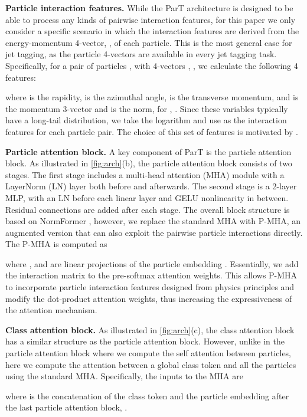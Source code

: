 \documentclass[nohyperref]{article}
\theoremstyle{plain}
\theoremstyle{definition}
\theoremstyle{remark}
\begin{document}
\textbf{Particle interaction features.} While the ParT architecture is designed to be able to process any kinds of pairwise interaction features, for this paper we only consider a specific scenario in which the interaction features are derived from the energy-momentum 4-vector, , of each particle. This is the most general case for jet tagging, as the particle 4-vectors are available in every jet tagging task. Specifically, for a pair of particles ,  with 4-vectors , , we calculate the following 4 features:

where  is the rapidity,  is the azimuthal angle,  is the transverse momentum, and  is the momentum 3-vector and  is the norm, for , . Since these variables typically have a long-tail distribution, we take the logarithm and use  as the interaction features for each particle pair. The choice of this set of features is  motivated by \citet{Dreyer:2020brq}.

\textbf{Particle attention block.} A key component of ParT is the particle attention block. As illustrated in \cref{fig:arch}(b), the particle attention block consists of two stages. The first stage includes a multi-head attention (MHA) module with a LayerNorm (LN) layer both before and afterwards. The second stage is a 2-layer MLP, with an LN before each linear layer and GELU nonlinearity in between. Residual connections are added after each stage. The overall block structure is based on NormFormer \cite{shleifer2021normformer}, however, we replace the standard MHA with P-MHA, an augmented version that can also exploit the pairwise particle interactions directly. The P-MHA is computed as 

where ,  and  are linear projections of the particle embedding . Essentially, we add the interaction matrix  to the pre-softmax attention weights. This allows P-MHA to incorporate particle interaction features designed from physics principles and modify the dot-product attention weights, thus increasing the expressiveness of the attention mechanism.

\textbf{Class attention block.} As illustrated in \cref{fig:arch}(c), the class attention block has a similar structure as the particle attention block. However, unlike in the particle attention block where we compute the self attention between particles, here we compute the attention between a global class token  and all the particles using the standard MHA. Specifically, the inputs to the MHA are 

where  is the concatenation of the class token and the particle embedding after the last particle attention block, . 
\end{document}
